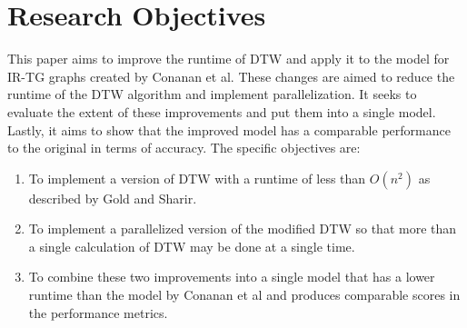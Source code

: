 \section{Research Objectives}

This paper aims to improve the runtime of DTW and apply it to the model for IR-TG graphs created by Conanan et al. These changes are aimed to reduce the runtime of the DTW algorithm and implement parallelization. It seeks to evaluate the extent of these improvements and put them into a single model. Lastly, it aims to show that the improved model has a comparable performance to the original in terms of accuracy. The specific objectives are:
\begin{enumerate}
    \item To implement a version of DTW with a runtime of less than $O(n^2)$ as described by Gold and Sharir.
    \item To implement a parallelized version of the modified DTW so that more than a single calculation of DTW may be done at a single time.
    \item To combine these two improvements into a single model that has a lower runtime than the model by Conanan et al and produces comparable scores in the performance metrics.
\end{enumerate}

